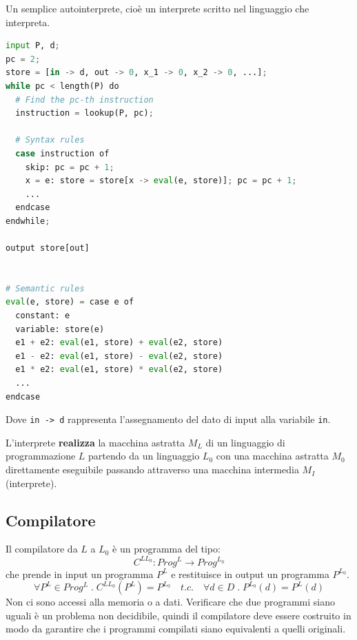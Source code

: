 \documentclass[a4paper]{article}
\begin{document}
\begin{example}
  Un semplice autointerprete, cioè un interprete scritto nel linguaggio che interpreta.
\begin{lstlisting}[language=Python]
input P, d;
pc = 2;
store = [in -> d, out -> 0, x_1 -> 0, x_2 -> 0, ...];
while pc < length(P) do
  # Find the pc-th instruction
  instruction = lookup(P, pc);

  # Syntax rules
  case instruction of
    skip: pc = pc + 1;
    x = e: store = store[x -> eval(e, store)]; pc = pc + 1;
    ...
  endcase
endwhile;

output store[out]


# Semantic rules
eval(e, store) = case e of
  constant: e
  variable: store(e)
  e1 + e2: eval(e1, store) + eval(e2, store)
  e1 - e2: eval(e1, store) - eval(e2, store)
  e1 * e2: eval(e1, store) * eval(e2, store)
  ...
endcase
\end{lstlisting}
Dove \texttt{in -> d} rappresenta l'assegnamento del dato di input alla variabile \texttt{in}.
\end{example}
\noindent
L'interprete \textbf{realizza} la macchina astratta \( M_L \) di un
linguaggio di programmazione \( L \) partendo da un linguaggio \( L_0 \) 
con una macchina astratta \( M_0 \) direttamente eseguibile passando
attraverso una macchina intermedia \( M_I \) (interprete).

\subsection{Compilatore}
\begin{definition}
  Il compilatore da \( L \) a \( L_0 \) è un programma del tipo:
  \[
    C^{LL_0}: Prog^L \to Prog^{L_0}
  \] 
  che prende in input un programma \( P^L \) e restituisce in output un programma \( P^{L_0} \).
  \[
    \forall P^L \in Prog^L \;.\; C^{LL_0}(P^L) = P^{L_0} \quad t.c. \quad
    \forall d \in D \;.\; P^{L_0}(d) = P^L(d)
  \] 
  Non ci sono accessi alla memoria o a dati. Verificare che due programmi
  siano uguali è un problema non decidibile, quindi il compilatore deve
  essere costruito in modo da garantire che i programmi compilati siano
  equivalenti a quelli originali.
\end{definition}
\end{document}
